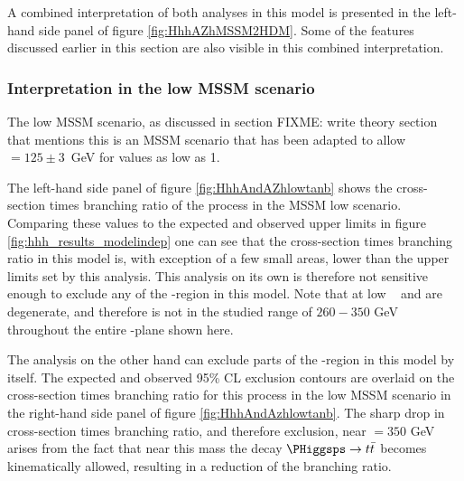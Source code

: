A combined interpretation of both analyses in this model is presented
in the left-hand side panel of figure \ref{fig:HhhAZhMSSM2HDM}. Some of the features discussed earlier
in this section are also visible in this combined interpretation.


\subsubsection{Interpretation in the low \tanb MSSM scenario}
\label{sec:hhh_results_modeldep_lowtb}
The low \tanb MSSM scenario, as discussed in section FIXME: write theory section that mentions this
is an MSSM scenario that has been adapted to allow \mh $=125 \pm 3$~GeV for \tanb values
as low as 1.  

The left-hand side panel of figure \ref{fig:HhhAndAZhlowtanb} shows the cross-section times branching ratio
of the \Htohhtobbtautau process in the MSSM low \tanb scenario. Comparing these values 
to the expected and observed upper limits in figure \ref{fig:hhh_results_modelindep} one
can see that the cross-section times branching ratio in this model is, with exception of a few small 
areas, lower than the upper limits set by this analysis. This analysis on its own is
therefore not sensitive enough to exclude any of the \mA-\tanb region in this model. Note that
at low \tanb ~ \mA and \mH are degenerate, and therefore \mH is not in the studied range of $260-350$ GeV
throughout the entire \mA-\tanb plane shown here.

The \AtoZhtolltautau analysis on the other hand can exclude parts of the \mA-\tanb region
in this model by itself. The expected and observed 95\% CL exclusion contours are overlaid 
on the cross-section times branching ratio for this process in the low \tanb MSSM scenario in the right-hand side panel 
of figure \ref{fig:HhhAndAzhlowtanb}. The sharp drop in cross-section times branching ratio, and therefore exclusion,
near \mA $ = 350$ GeV arises from the fact that near this mass the decay $\PHiggsps \rightarrow t\bar{t}$ becomes
kinematically allowed, resulting in a reduction of the \AtoZh branching ratio.


